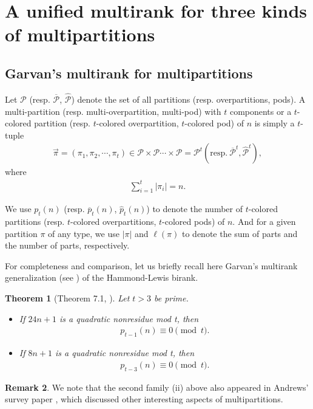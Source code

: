 \documentclass[12pt]{amsart}
\numberwithin{equation}{section}
\theoremstyle{plain}
\newtheorem{theorem}{Theorem}[section]
\theoremstyle{definition}
\newtheorem{remark}[theorem]{Remark}
\begin{document}
\section{A unified multirank for three kinds of multipartitions}\label{sec:over and pod}
\subsection{Garvan's multirank for multipartitions}
Let $\mathcal{P}$ (resp. $\mathcal{\overline{P}}$, $\mathcal{\hat{P}}$) denote the set of all partitions (resp. overpartitions, pods). A multi-partition (resp. multi-overpartition, multi-pod) with $t$ components or a $t$-colored partition (resp. $t$-colored overpartition, $t$-colored pod) of $n$ is simply a $t$-tuple
\begin{align*}
\overrightarrow{\pi}=(\pi_{1},\pi_{2},\cdots,\pi_{t})\in\mathcal{P}\times\mathcal{P}\cdots\times\mathcal{P}
=\mathcal{P}^{t} (\textrm{resp}.~\mathcal{\overline{P}}^{t}, \mathcal{\hat{P}}^t),
\end{align*}
where
\begin{align*}
\sum_{i=1}^{t}|\pi_{i}|=n.
\end{align*}

We use $p_t(n)$ (resp. $\overline{p}_t(n)$, $\hat{p}_t(n)$) to denote the number of $t$-colored partitions (resp. $t$-colored overpartitions, $t$-colored pods) of $n$. And for a given partition $\pi$ of any type, we use $|\pi|$ and $\ell(\pi)$ to denote the sum of parts and the number of parts, respectively.

For completeness and comparison, let us briefly recall here Garvan's multirank generalization (see \cite{Gar2}) of the Hammond-Lewis birank.

\begin{theorem}[Theorem 7.1, \cite{Gar2}]\label{Gmulti}
Let $t>3$ be prime.
\begin{itemize}
\item[(i)] If $24n+1$ is a quadratic nonresidue mod t, then
\begin{align*}
p_{t-1}(n)\equiv 0 \pmod{t}.
\end{align*}
\item[(ii)] If $8n+1$ is a quadratic nonresidue mod t, then
\begin{align*}
p_{t-3}(n)\equiv 0 \pmod{t}.
\end{align*}
\end{itemize}
\end{theorem}
\begin{remark}
We note that the second family (ii) above also appeared in Andrews' survey paper \cite{Andr2}, which discussed other interesting aspects of multipartitions.
\end{remark}
\end{document}
